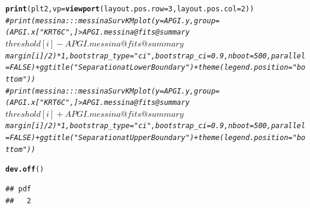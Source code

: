 \documentclass{article}\usepackage[]{graphicx}\usepackage[]{color}
\makeatletter
\newcommand{\hlnum}[1]{\textcolor[rgb]{0.686,0.059,0.569}{#1}}%
\newcommand{\hlcom}[1]{\textcolor[rgb]{0.678,0.584,0.686}{\textit{#1}}}%
\newcommand{\hlstd}[1]{\textcolor[rgb]{0.345,0.345,0.345}{#1}}%
\newcommand{\hlkwc}[1]{\textcolor[rgb]{0.333,0.667,0.333}{#1}}%
\newcommand{\hlkwd}[1]{\textcolor[rgb]{0.737,0.353,0.396}{\textbf{#1}}}%
\newenvironment{kframe}{%
 \def\at@end@of@kframe{}%
 \ifinner\ifhmode%
  \def\at@end@of@kframe{\end{minipage}}%
  \begin{minipage}{\columnwidth}%
 \fi\fi%
 \def\FrameCommand##1{\hskip\@totalleftmargin \hskip-\fboxsep
 \colorbox{shadecolor}{##1}\hskip-\fboxsep
     \hskip-\linewidth \hskip-\@totalleftmargin \hskip\columnwidth}%
 \MakeFramed {\advance\hsize-\width
   \@totalleftmargin\z@ \linewidth\hsize
   \@setminipage}}%
 {\par\unskip\endMakeFramed%
 \at@end@of@kframe}
\newenvironment{knitrout}{}{} %
\makeatother
\begin{document}
\begin{knitrout}
\begin{kframe}
{\ttfamily\noindent\color{warningcolor}{\#\# Warning: Removed 2 rows containing missing values (geom\_path).}}\begin{alltt}
\hlkwd{print}\hlstd{(plt2,} \hlkwc{vp} \hlstd{=} \hlkwd{viewport}\hlstd{(}\hlkwc{layout.pos.row} \hlstd{=} \hlnum{3}\hlstd{,} \hlkwc{layout.pos.col} \hlstd{=} \hlnum{2}\hlstd{))}
\hlcom{# print(messina:::messinaSurvKMplot(y = APGI.y, group = (APGI.x["KRT6C",] > APGI.messina@fits@summary$threshold[i] - APGI.messina@fits@summary$margin[i]/2)*1, bootstrap_type = "ci", bootstrap_ci = 0.9, nboot = 500, parallel = FALSE) + ggtitle("Separation at Lower Boundary") + theme(legend.position = "bottom"))}
\hlcom{# print(messina:::messinaSurvKMplot(y = APGI.y, group = (APGI.x["KRT6C",] > APGI.messina@fits@summary$threshold[i] + APGI.messina@fits@summary$margin[i]/2)*1, bootstrap_type = "ci", bootstrap_ci = 0.9, nboot = 500, parallel = FALSE) + ggtitle("Separation at Upper Boundary") + theme(legend.position = "bottom"))}

\hlkwd{dev.off}\hlstd{()}
\end{alltt}
\begin{verbatim}
## pdf 
##   2
\end{verbatim}
\end{kframe}
\end{knitrout}
\end{document}
